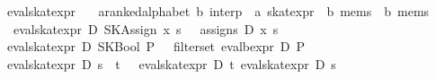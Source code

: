 \documentclass{llncs}
\begin{document}
\begin{isabellebody}
\isanewline
{}\isamarkupfalse%
\ eval{}skat{}expr\ {}{}\isanewline
\ \ {}{}{}a{}{}ranked{}alphabet{}\ {}b{}\ interp\ {}\ {}a\ skat{}expr\ {}\ {}b\ mems\ {}\ {}b\ mems{}\isanewline
\ \ \isanewline
\ \ {}eval{}skat{}expr\ D\ {}SKAssign\ x\ s{}\ {}\ {}\ assigns\ D\ x\ s\ {}{}\isanewline
{}\ {}eval{}skat{}expr\ D\ {}SKBool\ P{}\ {}\ {}\ filter{}set\ {}eval{}bexpr\ D\ P{}\ {}{}\isanewline
{}\ {}eval{}skat{}expr\ D\ {}s\ {}\ t{}\ {}\ {}\ eval{}skat{}expr\ D\ t\ {}eval{}skat{}expr\ D\ s\ {}{}{}\isanewline

\end{isabellebody}
\end{document}
